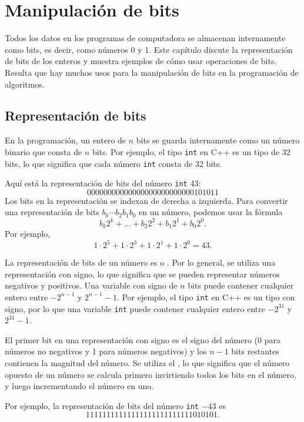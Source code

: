 \chapter{Manipulación de bits}

Todos los datos en los programas de computadora se almacenan internamente como bits,
es decir, como números 0 y 1.
Este capítulo discute la representación de bits
de los enteros y muestra ejemplos
de cómo usar operaciones de bits.
Resulta que hay muchos usos para
la manipulación de bits en la programación de algoritmos.

\section{Representación de bits}


En la programación, un entero de $n$ bits se guarda internamente
como un número binario que consta de $n$ bits.
Por ejemplo, el tipo \texttt{int} en C++ es
un tipo de 32 bits, lo que significa que cada número \texttt{int}
consta de 32 bits.

Aquí está la representación de bits del
número \texttt{int} 43:
\[00000000000000000000000000101011\]
Los bits en la representación se indexan de derecha a izquierda.
Para convertir una representación de bits $b_k \cdots b_2 b_1 b_0$ en un número,
podemos usar la fórmula
\[b_k 2^k + \ldots + b_2 2^2 + b_1 2^1 + b_0 2^0.\]
Por ejemplo,
\[1 \cdot 2^5 + 1 \cdot 2^3 + 1 \cdot 2^1 + 1 \cdot 2^0 = 43.\]

La representación de bits de un número es
 o .
Por lo general, se utiliza una representación con signo,
lo que significa que se pueden representar
números negativos y positivos.
Una variable con signo de $n$ bits puede contener cualquier
entero entre $-2^{n-1}$ y $2^{n-1}-1$.
Por ejemplo, el tipo \texttt{int} en C++ es
un tipo con signo, por lo que una variable \texttt{int} puede contener cualquier
entero entre $-2^{31}$ y $2^{31}-1$.

El primer bit en una representación con signo
es el signo del número (0 para números no negativos
y 1 para números negativos) y
los $n-1$ bits restantes contienen la magnitud del número.
Se utiliza el , lo que significa que el
número opuesto de un número se calcula primero
invirtiendo todos los bits en el número,
y luego incrementando el número en uno.

Por ejemplo, la representación de bits del
número \texttt{int} $-43$ es
\[11111111111111111111111111010101.\]

